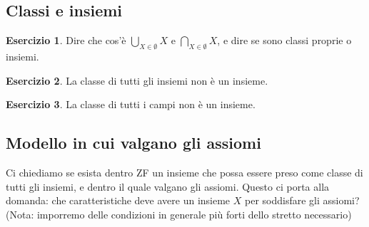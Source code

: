 \documentclass[a4paper,10pt,oneside]{article}
\theoremstyle{plain}
\theoremstyle{definition}
\newtheorem{myex}{Esercizio}
\theoremstyle{remark}
\begin{document}
\subsection{Classi e insiemi}
\begin{myex}
 Dire che cos'è $\bigcup_{X\in \emptyset} X$ e $\bigcap_{X\in \emptyset} X$, e dire se sono classi proprie o insiemi.
\end{myex}
\begin{myex}
 La classe di tutti gli insiemi non è un insieme.
\end{myex}
\begin{myex}
 La classe di tutti i campi non è un insieme.
\end{myex}

\subsection{Modello in cui valgano gli assiomi}

Ci chiediamo se esista dentro ZF un insieme che possa essere preso come classe di tutti gli insiemi, e dentro il quale valgano gli assiomi. Questo ci porta alla domanda: che caratteristiche deve avere un insieme $X$ per soddisfare gli assiomi? (Nota: imporremo delle condizioni in generale più forti dello stretto necessario)
\end{document}
